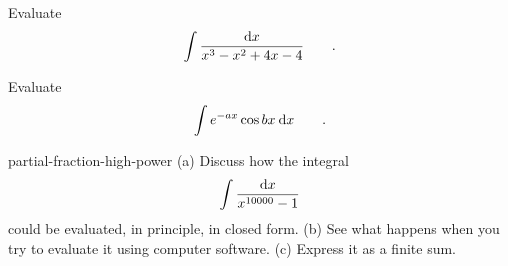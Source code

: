 \begin{hwsection}
\begin{hw}
Evaluate
\begin{equation*}
  \int \frac{\textup{d} x}{x^3-x^2+4x-4} \qquad .
\end{equation*}
\end{hw}

\begin{hw}
Evaluate
\begin{equation*}
  \int e^{-ax}\cos bx \: \textup{d} x \qquad .
\end{equation*}
\end{hw}

\begin{hwwithsoln}[2]{partial-fraction-high-power}
(a) Discuss how the integral
\begin{equation*}
  \int \frac{\textup{d} x}{x^{10000}-1}
\end{equation*}
could be evaluated, in principle, in closed form. (b) See what happens when you try to evaluate it using computer software.
(c) Express it as a finite sum.
\end{hwwithsoln}

\end{hwsection}
